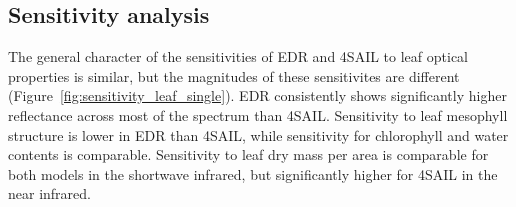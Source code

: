 \subsection{Sensitivity analysis}


The general character of the sensitivities of EDR and 4SAIL to leaf optical properties is similar,
but the magnitudes of these sensitivites are different (Figure~\ref{fig:sensitivity_leaf_single}).
EDR consistently shows significantly higher reflectance across most of the spectrum than 4SAIL\@.
Sensitivity to leaf mesophyll structure is lower in EDR than 4SAIL, while sensitivity for chlorophyll and water contents is comparable.
Sensitivity to leaf dry mass per area is comparable for both models in the shortwave infrared, but significantly higher for 4SAIL in the near infrared.




